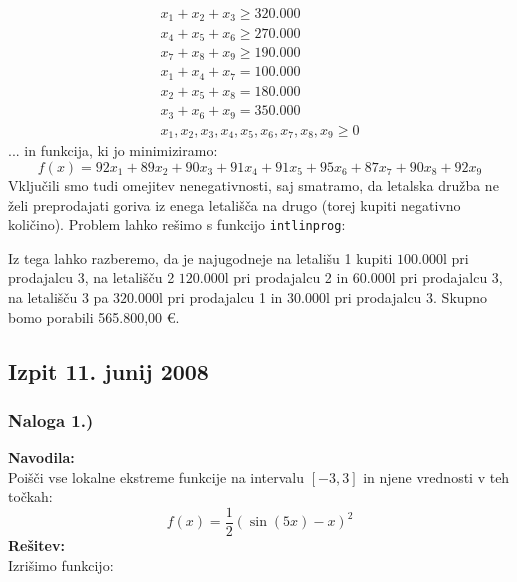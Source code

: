 \documentclass[a4paper,11pt]{article}
\begin{document}
\begin{equation} \label{con:maj2008_5}
\begin{gathered}
x_1 + x_2 + x_3 \geq 320.000 \\
x_4 + x_5 + x_6 \geq 270.000 \\
x_7 + x_8 + x_9 \geq 190.000 \\
x_1 + x_4 + x_7 = 100.000 \\
x_2 + x_5 + x_8 = 180.000 \\
x_3 + x_6 + x_9 = 350.000 \\
x_1, x_2, x_3, x_4, x_5, x_6, x_7, x_8, x_9 \geq 0
\end{gathered}
\end{equation}
... in funkcija, ki jo minimiziramo:
\begin{equation} \label{eq:maj2008_5}
f(x) = 92x_1 + 89x_2 + 90x_3 + 91x_4 + 91x_5 + 95x_6 + 87x_7 + 90x_8 + 92x_9
\end{equation}
Vključili smo tudi omejitev nenegativnosti, saj smatramo, da letalska družba ne želi preprodajati goriva iz enega letališča na drugo (torej kupiti negativno količino). Problem lahko rešimo s funkcijo \texttt{intlinprog}:

Iz tega lahko razberemo, da je najugodneje na letališu 1 kupiti $100.000\si{\litre}$ pri prodajalcu 3, na letališču 2 $120.000\si{\litre}$ pri prodajalcu 2 in $60.000\si{\litre}$ pri prodajalcu 3, na letališču 3 pa $320.000\si{\litre}$ pri prodajalcu 1 in $30.000\si{\litre}$ pri prodajalcu 3. Skupno bomo porabili 565.800,00 \euro{}.


\subsection{Izpit 11. junij 2008}

\subsubsection{Naloga 1.)}
\label{task:junij2008_1}

\textbf{Navodila:} \\
Poišči vse lokalne ekstreme funkcije na intervalu $[-3, 3]$ in njene vrednosti v teh točkah:
\begin{equation} \label{eq:junij2008_1}
f(x) = \frac{1}{2}( \sin(5x) - x)^2
\end{equation}
\textbf{Rešitev:} \\
Izrišimo funkcijo:
\end{document}
